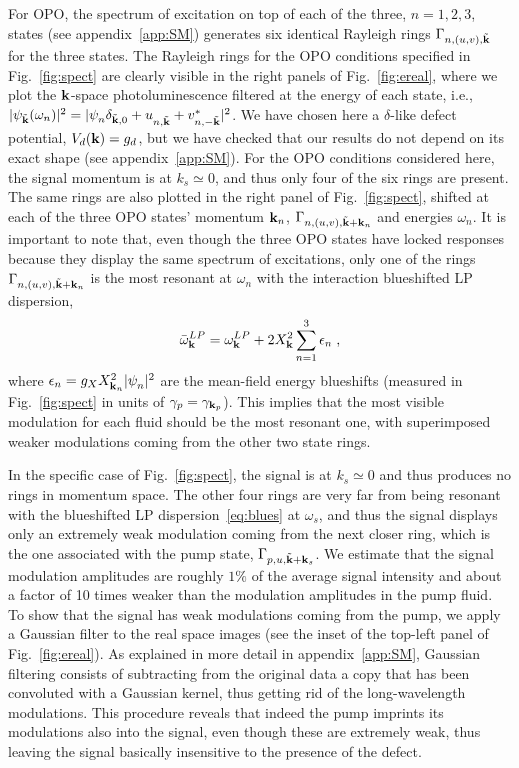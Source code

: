 For OPO, the spectrum of excitation on top of each of the three,
$n=1,2,3$, states (see appendix~\ref{app:SM}) generates six identical
Rayleigh rings $\Gamma_{n,(u,v), \tilde{\mathbf{k}}}$ for the three states.
%
The Rayleigh rings for the OPO conditions specified in
Fig.~\ref{fig:spect} are clearly visible in the right panels of
Fig.~\ref{fig:ereal}, where we plot the $\mathbf{k}$-space
photoluminescence filtered at the energy of each state, i.e.,
$|\psi_{\tilde{\mathbf{k}}} (\omega_n)|^2= |\psi_{n}^{}
\delta_{\tilde{\mathbf{k}},0} + u_{n,\tilde{\mathbf{k}}}^{} +
v^*_{n,-\tilde{\mathbf{k}}}|^2$.
%
We have chosen here a $\delta$-like defect potential, $V_d(\mathbf{k}) =
g_d$, but we have  checked that our results do not depend on
its exact shape (see appendix~\ref{app:SM}).
%
For the OPO conditions considered here, the signal momentum is at $k_s
\simeq 0$, and thus only four of the six rings are present. The same
rings are also plotted in the right panel of Fig.~\ref{fig:spect},
shifted at each of the three OPO states' momentum $\mathbf{k}_n$,
$\Gamma_{n,(u,v), \tilde{\mathbf{k}}+\mathbf{k}_n}$ and energies
$\omega_n$.
%
It is important to note that, even though the three OPO states have
locked responses because they display the same spectrum of
excitations, only one of the rings $\Gamma_{n,(u,v),
  \tilde{\mathbf{k}}+\mathbf{k}_n}$ is the most resonant at $\omega_n$
with the interaction blueshifted LP dispersion,
%
\begin{equation}
  \bar{\omega}_{\mathbf{k}}^{LP} = \omega_{\mathbf{k}}^{LP} + 2 
  X_{\mathbf{k}}^2 \sum_{n=1}^3  \epsilon_n\; ,
\label{eq:blues}
\end{equation}
%
where $\epsilon_n = g_X X_{\mathbf{k}_n}^2 |\psi_n^{}|^2$ are the
mean-field energy blueshifts (measured in Fig.~\ref{fig:spect} in
units of $\gamma_p = \gamma_{\mathbf{k}_p}$).  This implies that the
most visible modulation for each fluid should be the most resonant
one, with superimposed weaker modulations coming from the other two
state rings.

In the specific case of Fig.~\ref{fig:spect}, the signal is at $k_s
\simeq 0$ and thus produces no rings in momentum space. The other four
rings are very far from being resonant with the blueshifted LP
dispersion~\eqref{eq:blues} at $\omega_s$, and thus the signal
displays only an extremely weak modulation coming from the next
closer ring, which is the one associated with the pump state,
$\Gamma_{p,u, \tilde{\mathbf{k}}+\mathbf{k}_s}$.
%
We estimate that the signal modulation amplitudes are roughly $1\%$ of
the average signal intensity and about a factor of 10 times weaker
than the modulation amplitudes in the pump fluid.
%
To show that the signal has weak modulations coming from
the pump, we apply a Gaussian filter to the real space images (see the
inset of the top-left panel of Fig.~\ref{fig:ereal}).
%
As explained in more detail in appendix~\ref{app:SM}, Gaussian
filtering consists of subtracting from the original data a copy that
has been convoluted with a Gaussian kernel, thus getting rid of the
long-wavelength modulations.
%
This procedure reveals that indeed the pump imprints its modulations
also into the signal, even though these are extremely weak, thus
leaving the signal basically insensitive to the presence of the
defect.

